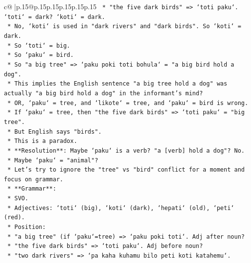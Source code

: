 \documentclass{article}
\begin{document}
{\begin{supertabular}{c@{$\;$}|p{.15\linewidth}@{}p{.15\linewidth}p{.15\linewidth}p{.15\linewidth}p{.15\linewidth}p{.15\linewidth}}
{{{\texttt{                        *   "the five dark birds" => `toti paku`. `toti` = dark? `koti` = dark.} \\
\texttt{                        *   No, `koti` is used in "dark rivers" and "dark birds". So `koti` = dark.} \\
\texttt{                        *   So `toti` = big.} \\
\texttt{                        *   So `paku` = bird.} \\
\texttt{                        *   So "a big tree" => `paku poki toti bohula` = "a big bird hold a dog".} \\
\texttt{                        *   This implies the English sentence "a big tree hold a dog" was actually "a big bird hold a dog" in the informant's mind?} \\
\texttt{                        *   OR, `paku` = tree, and `likote` = tree, and `paku` = bird is wrong.} \\
\texttt{                        *   If `paku` = tree, then "the five dark birds" => `toti paku` = "big tree".} \\
\texttt{                        *   But English says "birds".} \\
\texttt{                        *   This is a paradox.} \\
\texttt{                        *   **Resolution**: Maybe `paku` is a verb? "a {[}verb{]} hold a dog"? No.} \\
\texttt{                        *   Maybe `paku` = "animal"?} \\
\texttt{                        *   Let's try to ignore the "tree" vs "bird" conflict for a moment and focus on grammar.} \\
\texttt{                        *   **Grammar**:} \\
\texttt{                            *   SVO.} \\
\texttt{                            *   Adjectives: `toti` (big), `koti` (dark), `hepati` (old), `peti` (red).} \\
\texttt{                            *   Position:} \\
\texttt{                                *   "a big tree" (if `paku`=tree) => `paku poki toti`. Adj after noun?} \\
\texttt{                                *   "the five dark birds" => `toti paku`. Adj before noun?} \\
\texttt{                                *   "two dark rivers" => `pa kaha kuhamu bilo peti koti katahemu`.} \\
}}}
\end{supertabular}}
\end{document}
